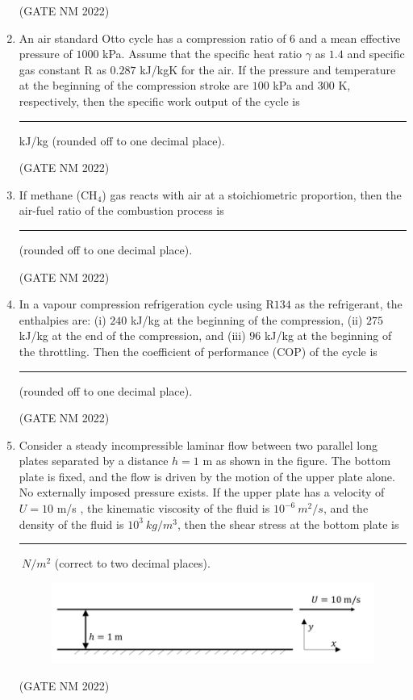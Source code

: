 \documentclass[journal,12pt,onecolumn]{IEEEtran}
\theoremstyle{remark}
\begin{document}
\begin{enumerate}
\hfill(GATE NM 2022)

\item An air standard Otto cycle has a compression ratio of $6$ and a mean effective pressure of $1000$ kPa.  
Assume that  the specific heat ratio $\gamma$ as $1.4$ and specific gas constant R as $0.287$ kJ/kgK for the air.  
If the pressure and temperature at the beginning of the compression stroke are $100$ kPa and $300$ K, respectively,  
then the specific work output of the cycle is \rule{3cm}{0.15mm} kJ/kg  (rounded off to one decimal place).

\hfill(GATE NM 2022)

\item  If methane (CH$_4$) gas reacts with air at a stoichiometric proportion, then the air-fuel ratio of the combustion process is  
\rule{3cm}{0.15mm}  (rounded off to one decimal place).

\hfill(GATE NM 2022)

\item In a vapour compression refrigeration cycle using R$134$ as the refrigerant, the enthalpies are:  
(i) $240$ kJ/kg at the beginning of the compression,  
(ii) $275$ kJ/kg at the end of the compression, and  
(iii) $96$ kJ/kg at the beginning of the throttling.  
Then the coefficient of performance (COP) of the cycle is \rule{3cm}{0.15mm} (rounded off to one decimal place).

\hfill(GATE NM 2022)

\item Consider a steady incompressible laminar flow between two parallel long plates separated by a distance  
$h = 1$ m  as shown in the figure.  
The bottom plate is fixed, and the flow is driven by the motion of the upper plate alone.  
No externally imposed pressure exists.  
If the upper plate has a velocity of $U = 10$ m/s , the kinematic viscosity of the fluid is  
$10^{-6}\ m^2/s$, and the density of the fluid is $10^3\ kg/m^3$,  
then the shear stress at the bottom plate is \rule{3cm}{0.15mm}  $\ N/m^2  $ (correct to two decimal places).
\begin{figure}[h]
	\centering
	\includegraphics[width=0.5\columnwidth]{fig18}
	\caption{}
	\label{fig:placeholder}
\end{figure}

\hfill(GATE NM 2022)

\end{enumerate}
\end{document}
